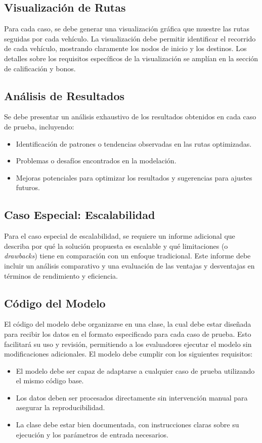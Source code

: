 \documentclass[12pt]{article}
\begin{document}
\subsection{Visualización de Rutas}
Para cada caso, se debe generar una visualización gráfica que muestre las rutas seguidas por cada vehículo. La visualización debe permitir identificar el recorrido de cada vehículo, mostrando claramente los nodos de inicio y los destinos. Los detalles sobre los requisitos específicos de la visualización se amplían en la sección de calificación y bonos.

\subsection{Análisis de Resultados}
Se debe presentar un análisis exhaustivo de los resultados obtenidos en cada caso de prueba, incluyendo:
\begin{itemize}
    \item Identificación de patrones o tendencias observadas en las rutas optimizadas.
    \item Problemas o desafíos encontrados en la modelación.
    \item Mejoras potenciales para optimizar los resultados y sugerencias para ajustes futuros.
\end{itemize}

\subsection{Caso Especial: Escalabilidad}
Para el caso especial de escalabilidad, se requiere un informe adicional que describa por qué la solución propuesta es escalable y qué limitaciones (o \textit{drawbacks}) tiene en comparación con un enfoque tradicional. Este informe debe incluir un análisis comparativo y una evaluación de las ventajas y desventajas en términos de rendimiento y eficiencia.

\subsection{Código del Modelo}
El código del modelo debe organizarse en una clase, la cual debe estar diseñada para recibir los datos en el formato especificado para cada caso de prueba. Esto facilitará su uso y revisión, permitiendo a los evaluadores ejecutar el modelo sin modificaciones adicionales. El modelo debe cumplir con los siguientes requisitos:
\begin{itemize}
    \item El modelo debe ser capaz de adaptarse a cualquier caso de prueba utilizando el mismo código base.
    \item Los datos deben ser procesados directamente sin intervención manual para asegurar la reproducibilidad.
    \item La clase debe estar bien documentada, con instrucciones claras sobre su ejecución y los parámetros de entrada necesarios.
\end{itemize}
\end{document}
